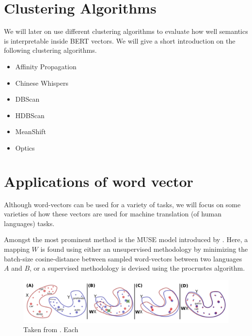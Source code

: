 \documentclass[a4paper,12pt,twoside,openright]{report}
\begin{document}

\section{Clustering Algorithms}

We will later on use different clustering algorithms to evaluate how well semantics is interpretable inside BERT vectors.
We will give a short introduction on the following clustering algorithms.

\begin{itemize}
\item Affinity Propagation
\item Chinese Whispers
\item DBScan
\item HDBScan
\item MeanShift
\item Optics
\end{itemize}


\section{Applications of word vector}


Although word-vectors can be used for a variety of tasks, we will focus on some varieties of how these vectors are used for machine translation (of human languages) tasks.

Amongst the most prominent method is the MUSE model introduced by \cite{conneau17}.
Here, a mapping $W$ is found using either an unsupervised methodology by minimizing the batch-size cosine-distance between sampled word-vectors between two languages $A$ and $B$, or a supervised methodology is devised using the procrustes algorithm.

\begin{figure}[h]
	\center
  \includegraphics[width=\linewidth]{./assets/relatedwork/muse.png}
  \caption{Taken from \cite{conneau17}. Each }
  \label{fig:muse_translation}
\end{figure}
\end{document}
